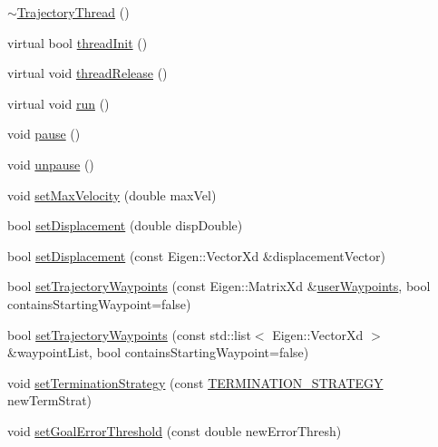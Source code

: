 \begin{DoxyCompactItemize}
\item 
\hyperlink{classocra__recipes_1_1TrajectoryThread_a7a54232683c5a3e3ef43f9b270b21c50}{$\sim$\+Trajectory\+Thread} ()
\item 
virtual bool \hyperlink{classocra__recipes_1_1TrajectoryThread_addd1165be15bc793294ad48486896377}{thread\+Init} ()
\item 
virtual void \hyperlink{classocra__recipes_1_1TrajectoryThread_a73f7ed04cf26697ca533b355930df23b}{thread\+Release} ()
\item 
virtual void \hyperlink{classocra__recipes_1_1TrajectoryThread_a835a13515f49bfa8ff047dbbaa6deb14}{run} ()
\item 
void \hyperlink{classocra__recipes_1_1TrajectoryThread_a5ca19050f1f7f7e396c558b98c9ee8d7}{pause} ()
\item 
void \hyperlink{classocra__recipes_1_1TrajectoryThread_ae5883c5bbd43285b1c548083219f709f}{unpause} ()
\item 
void \hyperlink{classocra__recipes_1_1TrajectoryThread_af09fa5d00ba024d18fd85870f878c1dd}{set\+Max\+Velocity} (double max\+Vel)
\item 
bool \hyperlink{classocra__recipes_1_1TrajectoryThread_a8cff41b23344e18cd795354ba893b3e2}{set\+Displacement} (double disp\+Double)
\item 
bool \hyperlink{classocra__recipes_1_1TrajectoryThread_ab068cd5ad8d3b000c0af32311c113141}{set\+Displacement} (const Eigen\+::\+Vector\+Xd \&displacement\+Vector)
\item 
bool \hyperlink{classocra__recipes_1_1TrajectoryThread_a6e6d4ad6f800c2782b821d0048506708}{set\+Trajectory\+Waypoints} (const Eigen\+::\+Matrix\+Xd \&\hyperlink{classocra__recipes_1_1TrajectoryThread_a54a762b3cdd7330322b39f288deda6a9}{user\+Waypoints}, bool contains\+Starting\+Waypoint=false)
\item 
bool \hyperlink{classocra__recipes_1_1TrajectoryThread_adc430918f3d6bba31dd364f02134a0f1}{set\+Trajectory\+Waypoints} (const std\+::list$<$ Eigen\+::\+Vector\+Xd $>$ \&waypoint\+List, bool contains\+Starting\+Waypoint=false)
\item 
void \hyperlink{classocra__recipes_1_1TrajectoryThread_ab401be5b4261576175d690b6e4a61177}{set\+Termination\+Strategy} (const \hyperlink{namespaceocra__recipes_afcf7ca623a6c39b246aa4bda629c7309}{T\+E\+R\+M\+I\+N\+A\+T\+I\+O\+N\+\_\+\+S\+T\+R\+A\+T\+E\+GY} new\+Term\+Strat)
\item 
void \hyperlink{classocra__recipes_1_1TrajectoryThread_a78eb7665f07bbdbd79bbc4553fb9d0e3}{set\+Goal\+Error\+Threshold} (const double new\+Error\+Thresh)

\end{DoxyCompactItemize}
